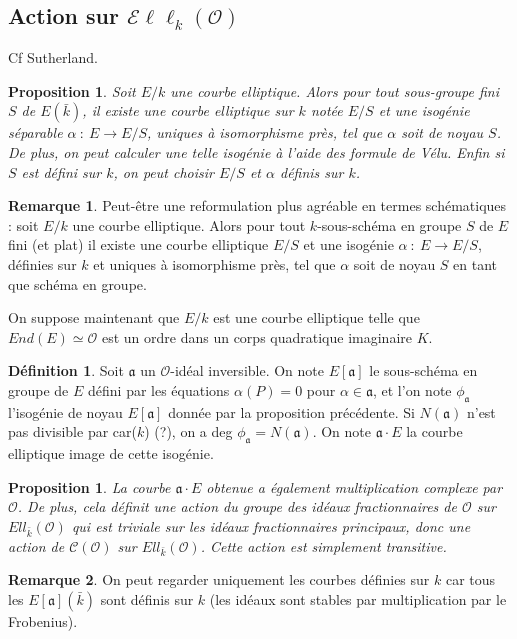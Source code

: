 \documentclass[11pt,a4paper]{article}
\renewcommand{\O}{\mathcal{O}}
\newcommand{\Cl}{\mathcal{C}}
\newcommand{\vers}{\rightarrow}
\newcommand{\Ell}{\mathcal{E}\ell\ell}
\renewcommand{\frak}{\mathfrak}
\newtheorem{prop}[thm]{Proposition}
\theoremstyle{definition}
\newtheorem*{rem}{Remarque}
\newtheorem{defi}[thm]{Définition}
\begin{document}
\subsection{Action sur $\Ell_k(\O)$}

Cf Sutherland.

\begin{prop}
Soit $E/k$ une courbe elliptique. Alors pour tout sous-groupe fini $S$ de $E(\bar{k})$, il existe une courbe elliptique sur $k$ notée $E/S$ et une isogénie séparable $\alpha\ :\ E \vers E/S$, uniques à isomorphisme près, tel que $\alpha$ soit de noyau $S$. De plus, on peut calculer une telle isogénie à l'aide des formule de Vélu. Enfin si $S$ est défini sur $k$, on peut choisir $E/S$ et $\alpha$ définis sur $k$.
\end{prop}

\begin{rem}
Peut-être une reformulation plus agréable en termes schématiques : soit $E/k$ une courbe elliptique. Alors pour tout $k$-sous-schéma en groupe $S$ de $E$ fini (et plat) il existe une courbe elliptique $E/S$ et une isogénie $\alpha\ :\ E\vers E/S$, définies sur $k$ et uniques à isomorphisme près, tel que $\alpha$ soit de noyau $S$ en tant que schéma en groupe.
\end{rem}

On suppose maintenant que $E/k$ est une courbe elliptique telle que $End(E)\simeq \O$ est un ordre dans un corps quadratique imaginaire $K$.

\begin{defi}
Soit $\frak a$ un $\O$-idéal inversible. On note $E[\frak a]$ le sous-schéma en groupe de $E$ défini par les équations $\alpha(P)=0$ pour $\alpha\in\frak a$, et l'on note $\phi_{\frak a}$ l'isogénie de noyau $E[\frak a]$ donnée par la proposition précédente. Si $N(\frak a)$ n'est pas divisible par car($k$) (?), on a deg $\phi_{\frak a}=N(\frak a)$. On note $\frak{a}\cdot E$ la courbe elliptique image de cette isogénie.
\end{defi}

\begin{prop}
La courbe $\frak{a}\cdot E$ obtenue a également multiplication complexe par $\O$. De plus, cela définit une action du groupe des idéaux fractionnaires de $\O$ sur $Ell_{\bar{k}}(\O)$ qui est triviale sur les idéaux fractionnaires principaux, donc une action de $\Cl(\O)$ sur $Ell_{\bar{k}}(\O)$. Cette action est simplement transitive.
\end{prop}


\begin{rem}
On peut regarder uniquement les courbes définies sur $k$ car tous les $E[\frak a](\bar{k})$ sont définis sur $k$ (les idéaux sont stables par multiplication par le Frobenius).
\end{rem}
\end{document}
